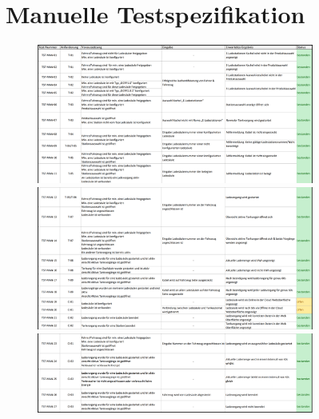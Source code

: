 \begin{figure} [!p]
\section{Manuelle Testspezifikation}
\label{Anhang:man_test}
\begin{figure} [H]
	\centering
	\includegraphics[width=1.0\textwidth]{images/Test/Manuelle_Tests_1.png}
	\includegraphics[width=1.0\textwidth]{images/Test/Manuelle_Tests_2.png}
	\includegraphics[width=1.0\textwidth]{images/Test/Manuelle_Tests_3.png}
\end{figure}
\end{figure}
